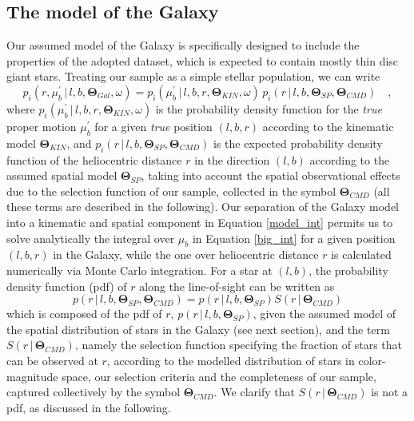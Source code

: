 \documentclass{nature}
\begin{document}
\begin{methods}
\subsection{The model of the Galaxy}

Our assumed model of the Galaxy is specifically designed to include the properties of the adopted dataset, which is expected to contain mostly thin disc giant stars\cite{Poggio:2018}. Treating our sample as a simple stellar population, we can write 
\begin{equation}
\label{model_int}
        p_i( r, \mu^\prime_{b} \, |\, l, b, \boldsymbol{\Theta}_{Gal}, \omega)  = 
        p_i( \mu^\prime_b \, | \, l, b, r, \boldsymbol{\Theta}_{KIN}, \omega)  \, p_i( r \, | \, l, b,\boldsymbol{\Theta}_{SP},\boldsymbol{\Theta}_{CMD})
       \quad,
\end{equation}
where $p_i( \mu^\prime_b \, | \, l, b, r, \boldsymbol{\Theta}_{KIN}, \omega)$ is the probability density function for the \emph{true} proper motion $\mu^\prime_{b}$ for a given \emph{true} position $(l,b,r)$ according to the kinematic model $\boldsymbol{\Theta}_{KIN}$, and $p_i( r \, | \, l, b,\boldsymbol{\Theta}_{SP},\boldsymbol{\Theta}_{CMD})$ is the expected probability density function of the heliocentric distance $r$ in the direction $(l,b)$ according to the assumed spatial model $\boldsymbol{\Theta}_{SP}$, taking into account the spatial observational effects due to the selection function of our sample, collected in the symbol $\boldsymbol{\Theta}_{CMD}$ (all these terms are described in the following). Our separation of the Galaxy model into a kinematic and spatial component in Equation \ref{model_int} permits us to solve analytically the integral over $\mu_b$ in Equation \ref{big_int} for a given position $(l,b,r)$ in the Galaxy, while the one over heliocentric distance $r$ is calculated numerically via Monte Carlo integration. For a star at $(l,b)$, the probability density function (pdf) of $r$ along the line-of-sight can be written as
\begin{equation}
\label{model_int_selfun}
        p( r \, | \, l, b,\boldsymbol{\Theta}_{SP},\boldsymbol{\Theta}_{CMD})  = 
                    p( r \, | \, l, b,\boldsymbol{\Theta}_{SP}) S( r \, | \, \boldsymbol{\Theta}_{CMD})
\end{equation}
which is composed of the pdf of $r$, $p( r \, | \, l, b,\boldsymbol{\Theta}_{SP})$, given the assumed model of the spatial distribution of stars in the Galaxy (see next section), and the term $S( r \, | \,\boldsymbol{\Theta}_{CMD})$, namely the selection function specifying the fraction of stars that can be observed at $r$, according to the modelled distribution of stars in color-magnitude space, our selection criteria and the completeness of our sample, captured collectively by the symbol $\boldsymbol{\Theta}_{CMD}$.  We clarify that $S( r \, | \, \boldsymbol{\Theta}_{CMD})$ is not a pdf, as discussed in the following.


\end{methods}
\end{document}
